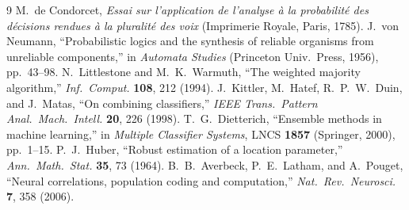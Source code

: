 \documentclass[aps,prapplied,preprint,amsmath,amssymb,floatfix]{revtex4-2}
\begin{document}
\begin{thebibliography}{9}
 M.~de Condorcet, \emph{Essai sur l'application de
l'analyse \`a la probabilit\'e des d\'ecisions rendues \`a la pluralit\'e
des voix} (Imprimerie Royale, Paris, 1785).
 J.~von Neumann, ``Probabilistic logics and the
synthesis of reliable organisms from unreliable components,'' in
\emph{Automata Studies} (Princeton Univ.\ Press, 1956), pp.~43--98.
 N.~Littlestone and M.~K.~Warmuth, ``The
weighted majority algorithm,'' \emph{Inf.\ Comput.} \textbf{108}, 212
(1994).
 J.~Kittler, M.~Hatef, R.~P.~W.~Duin, and J.~Matas,
``On combining classifiers,'' \emph{IEEE Trans.\ Pattern Anal.\ Mach.\
Intell.} \textbf{20}, 226 (1998).
 T.~G.~Dietterich, ``Ensemble methods in machine
learning,'' in \emph{Multiple Classifier Systems}, LNCS \textbf{1857}
(Springer, 2000), pp.~1--15.
 P.~J.~Huber, ``Robust estimation of a location
parameter,'' \emph{Ann.\ Math.\ Stat.} \textbf{35}, 73 (1964).
 B.~B.~Averbeck, P.~E.~Latham, and A.~Pouget,
``Neural correlations, population coding and computation,'' \emph{Nat.\
Rev.\ Neurosci.} \textbf{7}, 358 (2006).
\end{thebibliography}
\end{document}
